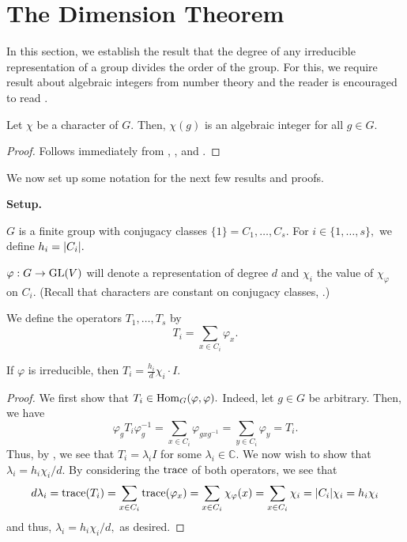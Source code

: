 \section{The Dimension Theorem} \label{sec:03}
In this section, we establish the result that the degree of any irreducible representation of a group divides the order of the group. For this, we require result about algebraic integers from number theory and the reader is encouraged to read .

\begin{prop} \label{prop:charisalgint}
	Let $\chi$ be a character of $G.$ Then, $\chi(g)$ is an algebraic integer for all $g \in G.$
\end{prop}
\begin{proof} 
	Follows immediately from , , and .
\end{proof}

We now set up some notation for the next few results and proofs.

\begin{aside}
	\textbf{Setup.}

	$G$ is a finite group with conjugacy classes $\{1\} = C_1, \ldots, C_s.$ For $i \in \{1, \ldots, s\},$ we define $h_i = {\left\lvert C_i \right\lvert}.$

	$\varphi : G \to \operatorname{GL}(V)$ will denote a representation of degree $d$ and $\chi_i$ the value of $\chi_\varphi$ on $C_i.$ (Recall that characters are constant on conjugacy classes, .)

	We define the operators $T_1, \ldots, T_s$ by
	\begin{equation*} 
		T_i = \sum_{x \in C_i} \varphi_x.
	\end{equation*}
\end{aside}

\begin{lem}
	If $\varphi$ is irreducible, then $T_i = \frac{h_i}{d}\chi_i \cdot I.$
\end{lem}
\begin{proof} 
	We first show that $T_i \in \operatorname{Hom}_{G}(\varphi, \varphi).$ Indeed, let $g \in G$ be arbitrary. Then, we have
	\begin{equation*} 
		\varphi_gT_i\varphi_g^{-1} = \sum_{x \in C_i} \varphi_{gxg^{-1}} = \sum_{y \in C_i} \varphi_y = T_i.
	\end{equation*}
	Thus, by , we see that $T_i = \lambda_iI$ for some $\lambda_i \in \mathbb{C}.$ We now wish to show that $\lambda_i = h_i\chi_i/d.$ By considering the $\operatorname{trace}$ of both operators, we see that
	\begin{equation*} 
		d\lambda_i = \operatorname{trace}(T_i) = \sum_{x \in C_i} \operatorname{trace}(\varphi_x) = \sum_{x \in C_i} \chi_\varphi(x) = \sum_{x \in C_i} \chi_i = {\left\lvert C_i \right\lvert}\chi_i = h_i\chi_i
	\end{equation*}
	and thus, $\lambda_i = h_i\chi_i/d,$ as desired.
\end{proof}

